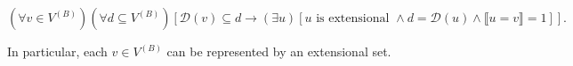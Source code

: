 $$(\forall v \in V^{(B)}) (\forall d \subseteq V^{(B)}) [\mathcal{D}(v) \subseteq d \rightarrow (\exists u) [u \text{ is extensional } \land d = \mathcal{D}(u) \land \llbracket u = v \rrbracket = 1]].$$

In particular, each $v \in V^{(B)}$ can be represented by an extensional set.
